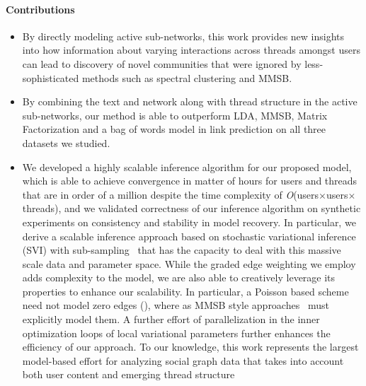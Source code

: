 \documentclass{sig-alternate}
\newcommand{\ericx}[1]{\textcolor{red}{\\ eric-comment: #1}}
\newcommand{\order}[1]{\textit{O}(#1)}
\begin{document}
\paragraph{Contributions}
\vspace*{-0.5\baselineskip}
\begin{itemize}
\itemsep0em
  \item By directly modeling active sub-networks, this work provides new insights into how information about varying interactions across threads amongst users can lead to discovery of novel communities that were ignored by less-sophisticated methods such as spectral clustering and MMSB.
 \item By combining the text and network along with thread structure in the active sub-networks, our method is able to outperform LDA, MMSB, Matrix Factorization and a bag of words model in link prediction on all three datasets we studied.
\item We developed a highly scalable inference algorithm for our proposed model, which is able to achieve convergence in
matter of hours for users and threads that are in order of a million despite the time complexity of \order{users$\times$users$\times$threads}, and we validated correctness of our inference algorithm on synthetic experiments on consistency and stability in model recovery. In particular, we derive a scalable inference approach based on
stochastic variational inference (SVI) with sub-sampling~\cite{Hoffman:2013:SVI} 
that has the capacity to deal with this massive scale data and parameter space.  While the graded edge weighting we employ adds complexity to the model, we are also able to creatively leverage its properties to enhance our scalability.  In particular, a Poisson based scheme need not model zero edges
(\cite{Kerrer:Newman}), where as MMSB style approaches~\cite{Airoldi:2008:MMS:1390681.1442798}
 must explicitly model them.
A further effort of parallelization in the inner optimization loops of local variational parameters further enhances the efficiency of our approach. To our knowledge, this work represents the largest 
model-based effort for analyzing social graph data that takes into account both user content and emerging thread structure
\end{itemize} 
\vspace*{-1\baselineskip}

\end{document}
